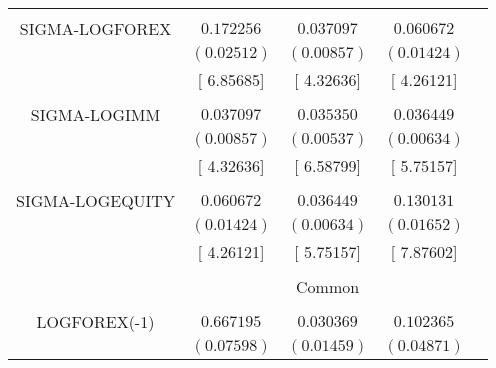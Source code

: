 \begin{tabular}{lrrrr}
\multicolumn{1}{c}{}&\multicolumn{1}{c}{}&\multicolumn{1}{c}{}&\multicolumn{1}{c}{}&\multicolumn{1}{c}{}\\
\multicolumn{1}{c}{SIGMA-LOGFOREX}&\multicolumn{1}{c}{$0.172256$}&\multicolumn{1}{c}{$0.037097$}&\multicolumn{1}{c}{$0.060672$}&\multicolumn{1}{c}{}\\
\multicolumn{1}{c}{}&\multicolumn{1}{c}{$(0.02512)$}&\multicolumn{1}{c}{$(0.00857)$}&\multicolumn{1}{c}{$(0.01424)$}&\multicolumn{1}{c}{}\\
\multicolumn{1}{c}{}&\multicolumn{1}{c}{[ 6.85685]}&\multicolumn{1}{c}{[ 4.32636]}&\multicolumn{1}{c}{[ 4.26121]}&\multicolumn{1}{c}{}\\
\multicolumn{1}{c}{}&\multicolumn{1}{c}{}&\multicolumn{1}{c}{}&\multicolumn{1}{c}{}&\multicolumn{1}{c}{}\\
\multicolumn{1}{c}{SIGMA-LOGIMM}&\multicolumn{1}{c}{$0.037097$}&\multicolumn{1}{c}{$0.035350$}&\multicolumn{1}{c}{$0.036449$}&\multicolumn{1}{c}{}\\
\multicolumn{1}{c}{}&\multicolumn{1}{c}{$(0.00857)$}&\multicolumn{1}{c}{$(0.00537)$}&\multicolumn{1}{c}{$(0.00634)$}&\multicolumn{1}{c}{}\\
\multicolumn{1}{c}{}&\multicolumn{1}{c}{[ 4.32636]}&\multicolumn{1}{c}{[ 6.58799]}&\multicolumn{1}{c}{[ 5.75157]}&\multicolumn{1}{c}{}\\
\multicolumn{1}{c}{}&\multicolumn{1}{c}{}&\multicolumn{1}{c}{}&\multicolumn{1}{c}{}&\multicolumn{1}{c}{}\\
\multicolumn{1}{c}{SIGMA-LOGEQUITY}&\multicolumn{1}{c}{$0.060672$}&\multicolumn{1}{c}{$0.036449$}&\multicolumn{1}{c}{$0.130131$}&\multicolumn{1}{c}{}\\
\multicolumn{1}{c}{}&\multicolumn{1}{c}{$(0.01424)$}&\multicolumn{1}{c}{$(0.00634)$}&\multicolumn{1}{c}{$(0.01652)$}&\multicolumn{1}{c}{}\\
\multicolumn{1}{c}{}&\multicolumn{1}{c}{[ 4.26121]}&\multicolumn{1}{c}{[ 5.75157]}&\multicolumn{1}{c}{[ 7.87602]}&\multicolumn{1}{c}{}\\
[4.5pt] \hline \\ [-4.5pt]
\multicolumn{1}{c}{}&\multicolumn{3}{c}{Common}&\multicolumn{1}{c}{}\\
[4.5pt] \hline \\ [-4.5pt]
\multicolumn{1}{c}{LOGFOREX(-1)}&\multicolumn{1}{c}{$0.667195$}&\multicolumn{1}{c}{$0.030369$}&\multicolumn{1}{c}{$0.102365$}&\multicolumn{1}{c}{}\\
\multicolumn{1}{c}{}&\multicolumn{1}{c}{$(0.07598)$}&\multicolumn{1}{c}{$(0.01459)$}&\multicolumn{1}{c}{$(0.04871)$}&\multicolumn{1}{c}{}\\

\end{tabular}
